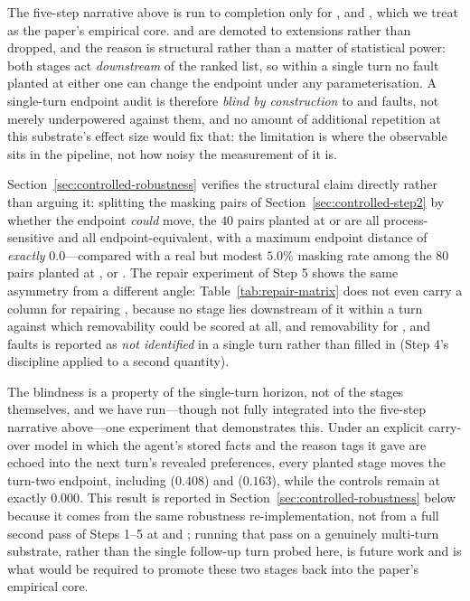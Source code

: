 The five-step narrative above is run to completion only for ,  and
, which we treat as the paper's empirical core.  and  are
demoted to extensions rather than dropped, and the reason is structural rather than a matter of
statistical power: both stages act \emph{downstream} of the ranked list, so within a single turn
no fault planted at either one can change the endpoint under any parameterisation. A single-turn
endpoint audit is therefore \emph{blind by construction} to  and 
faults, not merely underpowered against them, and no amount of additional repetition at this
substrate's effect size would fix that: the limitation is where the observable sits in the
pipeline, not how noisy the measurement of it is.

Section~\ref{sec:controlled-robustness} verifies the structural claim directly rather than arguing
it: splitting the masking pairs of Section~\ref{sec:controlled-step2} by whether the endpoint
\emph{could} move, the $40$ pairs planted at  or  are all
process-sensitive and all endpoint-equivalent, with a maximum endpoint distance of \emph{exactly}
$0.0$---compared with a real but modest $5.0\%$ masking rate among the $80$ pairs planted at
,  or . The repair experiment of Step 5 shows the same
asymmetry from a different angle: Table~\ref{tab:repair-matrix} does not even carry a column for
repairing , because no stage lies downstream of it within a turn against which
removability could be scored at all, and removability for ,  and
 faults is reported as \emph{not identified} in a single turn rather than filled in
(Step 4's discipline applied to a second quantity).

The blindness is a property of the single-turn horizon, not of the stages themselves, and we have
run---though not fully integrated into the five-step narrative above---one experiment that
demonstrates this. Under an explicit carry-over model in which the agent's stored facts and the
reason tags it gave are echoed into the next turn's revealed preferences, every planted stage moves
the turn-two endpoint, including  ($0.408$) and  ($0.163$), while the
controls remain at exactly $0.000$. This result is reported in
Section~\ref{sec:controlled-robustness} below because it comes from the same robustness
re-implementation, not from a full second pass of Steps 1--5 at  and
; running that pass on a genuinely multi-turn substrate, rather than the single
follow-up turn probed here, is future work and is what would be required to promote these two
stages back into the paper's empirical core.

